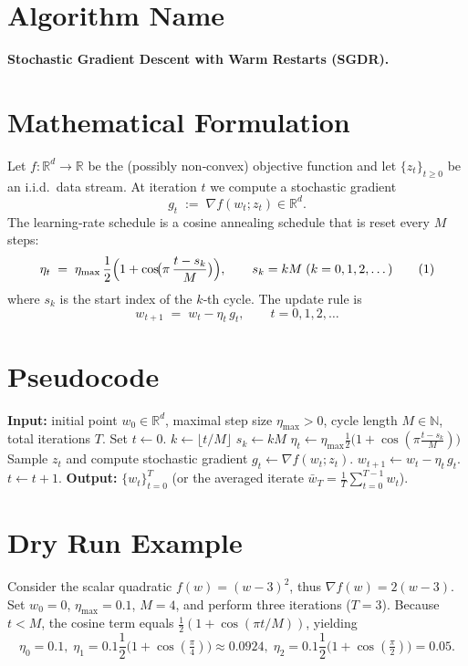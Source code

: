 \documentclass{article}
\newcommand{\RR}{\mathbb{R}}
\begin{document}
\section*{Algorithm Name}
\textbf{Stochastic Gradient Descent with Warm Restarts (SGDR).}

\section*{Mathematical Formulation}
Let $f:\RR^{d}\rightarrow\RR$ be the (possibly non‑convex) objective function and let
$\{z_{t}\}_{t\ge 0}$ be an i.i.d.\ data stream.  
At iteration $t$ we compute a stochastic gradient
\[
g_{t}\;:=\;\nabla f(w_{t};z_{t})\in\RR^{d}.
\]
The learning‑rate schedule is a cosine annealing schedule that is reset every $M$ steps:
\[
\eta_{t}\;=\;\eta_{\max}\,\frac{1}{2}\Bigl(1+\cos\!\bigl(\pi\,\frac{t-s_{k}}{M}\bigr)\Bigr),
\qquad 
s_{k}=kM\;(k=0,1,2,\dots)
\tag{1}
\]
where $s_{k}$ is the start index of the $k$‑th cycle.  
The update rule is
\[
w_{t+1}\;=\;w_{t}-\eta_{t}\,g_{t},\qquad t=0,1,2,\dots
\tag{2}
\]

\section*{Pseudocode}
\begin{algorithm}[H]
\caption{SGDR}
\begin{algorithmic}[1]
\State \textbf{Input:} initial point $w_{0}\in\RR^{d}$, maximal step size $\eta_{\max}>0$, cycle length $M\in\mathbb{N}$, total iterations $T$.
\State Set $t\gets0$.
    \State $k\gets \lfloor t/M\rfloor$ 
    \State $s_{k}\gets kM$ 
    \State $\displaystyle \eta_{t}\gets \eta_{\max}\frac12\bigl(1+\cos(\pi\frac{t-s_{k}}{M})\bigr)$ 
    \State Sample $z_{t}$ and compute stochastic gradient $g_{t}\gets\nabla f(w_{t};z_{t})$.
    \State $w_{t+1}\gets w_{t}-\eta_{t}\,g_{t}$.
    \State $t\gets t+1$.
\EndWhile
\State \textbf{Output:} $\{w_{t}\}_{t=0}^{T}$ (or the averaged iterate $\bar w_{T}=\frac1T\sum_{t=0}^{T-1}w_{t}$).
\end{algorithmic}
\end{algorithm}

\section*{Dry Run Example}
Consider the scalar quadratic $f(w)=(w-3)^{2}$, thus $\nabla f(w)=2(w-3)$.  
Set $w_{0}=0$, $\eta_{\max}=0.1$, $M=4$, and perform three iterations ($T=3$).  
Because $t<M$, the cosine term equals $\frac12(1+\cos(\pi t/M))$, yielding
\[
\eta_{0}=0.1,\;\eta_{1}=0.1\frac12\!\bigl(1+\cos(\tfrac{\pi}{4})\bigr)\approx0.0924,\;
\eta_{2}=0.1\frac12\!\bigl(1+\cos(\tfrac{\pi}{2})\bigr)=0.05.
\]
\end{document}
